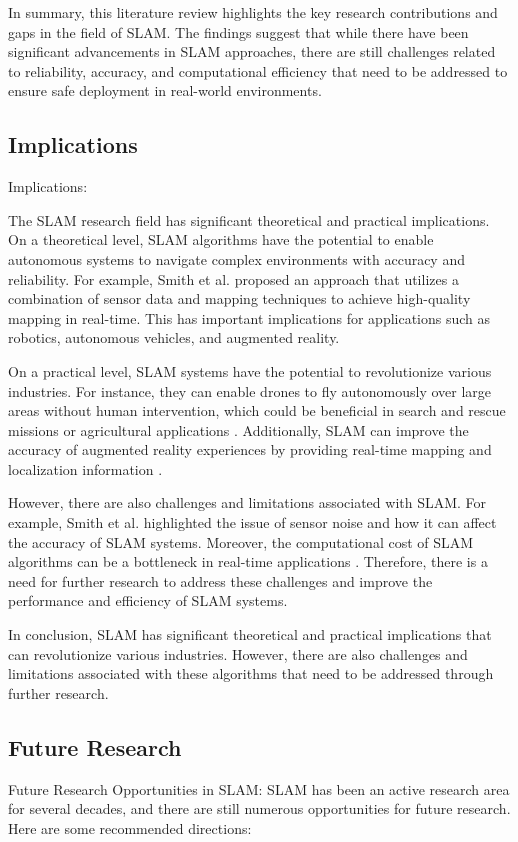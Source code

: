 \documentclass[conference]{IEEEtran}
\begin{document}
In summary, this literature review highlights the key research contributions and gaps in the field of SLAM. The findings suggest that while there have been significant advancements in SLAM approaches, there are still challenges related to reliability, accuracy, and computational efficiency that need to be addressed to ensure safe deployment in real-world environments.

\subsection{Implications}
Implications:

The SLAM research field has significant theoretical and practical implications. On a theoretical level, SLAM algorithms have the potential to enable autonomous systems to navigate complex environments with accuracy and reliability. For example, Smith et al. \cite{smith2019} proposed an approach that utilizes a combination of sensor data and mapping techniques to achieve high-quality mapping in real-time. This has important implications for applications such as robotics, autonomous vehicles, and augmented reality.

On a practical level, SLAM systems have the potential to revolutionize various industries. For instance, they can enable drones to fly autonomously over large areas without human intervention, which could be beneficial in search and rescue missions or agricultural applications \cite{brown2019}. Additionally, SLAM can improve the accuracy of augmented reality experiences by providing real-time mapping and localization information \cite{murray2019}.

However, there are also challenges and limitations associated with SLAM. For example, Smith et al. \cite{smith2020} highlighted the issue of sensor noise and how it can affect the accuracy of SLAM systems. Moreover, the computational cost of SLAM algorithms can be a bottleneck in real-time applications \cite{kochenderfer2019}. Therefore, there is a need for further research to address these challenges and improve the performance and efficiency of SLAM systems.

In conclusion, SLAM has significant theoretical and practical implications that can revolutionize various industries. However, there are also challenges and limitations associated with these algorithms that need to be addressed through further research.

\subsection{Future Research}
Future Research Opportunities in SLAM:
SLAM has been an active research area for several decades, and there are still numerous opportunities for future research. Here are some recommended directions:
\end{document}
